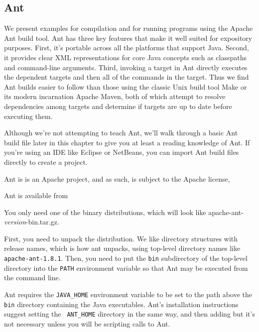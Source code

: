 \subsection{Ant}

We present examples for compilation and for running programs
using the Apache Ant build tool.  Ant has three key features that make
it well suited for expository purposes.  First, it's portable across
all the platforms that support Java.  Second, it provides clear XML
representations for core Java concepts such as classpaths and
command-line arguments.  Third, invoking a target in Ant directly
executes the dependent targets and then all of the commands in the
target.  Thus we find Ant builds easier to follow than those using the
classic Unix build tool Make or its modern incarnation Apache Maven, both
of which attempt to resolve dependencies among targets and determine
if targets are up to date before executing them.

Although we're not attempting to teach Ant, we'll walk through a basic
Ant build file later in this chapter to give you at least a reading
knowledge of Ant.  If you're using an IDE like Eclipse or NetBeans,
you can import Ant build files directly to create a project.

Ant is is an Apache project, and as such, is subject to the Apache license,
\begin{quote}
\end{quote}
%
Ant is available from 
%
\begin{quote}
\end{quote}
%
You only need one of the binary distributions, which will
look like {\ttfamily apache-ant-{\it\ttfamily version}-bin.tar.gz}.

First, you need to unpack the distribution.  We like directory
structures with release names, which is how ant unpacks, using
top-level directory names like {\tt apache-ant-1.8.1}.  Then, you need
to put the {\tt bin} subdirectory of the top-level directory into the
{\tt PATH} environment variable so that Ant may be executed from the
command line.

Ant requires the {\tt JAVA\_HOME} environment variable to be set to
the path above the {\tt bin} directory containing the Java
executables.  Ant's installation instructions suggest setting the {\tt
ANT\_HOME} directory in the same way, and then adding but it's not
necessary unless you will be scripting calls to Ant.

